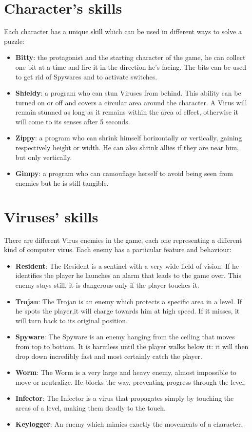 \documentclass[12pt, a4paper]{report}
\begin{document}
\section*{Character’s skills}
Each character has a unique skill which can be used in different ways to solve a puzzle:
\begin{itemize}
	\item \textbf{Bitty}: the protagonist and the starting character of the game, he can collect one bit at a time and fire it in the direction he’s facing. The bits can be used to get rid of Spywares and to activate switches.
	\item \textbf{Shieldy}: a program who can stun Viruses from behind. This ability can be turned on or off and covers a circular area around the 				character. A Virus will remain stunned as long as it remains within the area of effect, otherwise it will come to its senses after 5 seconds.
	\item \textbf{Zippy}:  a program who can shrink himself horizontally or vertically, gaining respectively height or width. He can also shrink allies if they are near him, but only vertically.
	\item \textbf{Gimpy}: a program who can camouflage herself to avoid being seen from enemies but he is still tangible.
\end{itemize}

\section*{Viruses' skills}
There are different Virus enemies in the game, each one representing a different kind of computer virus. Each enemy has a particular feature and behaviour:
\begin{itemize}
	\item \textbf{Resident}: The Resident is a sentinel with a very wide field of vision. If he identifies the player he launches an alarm that leads to the game 		over. This enemy stays still, it is dangerous only if the player touches it.
	\item \textbf{Trojan}: The Trojan is an enemy which protects a specific area in a level. If he spots the player,it will charge towards him at high speed. If it misses, it will turn back to its original position.
	\item \textbf{Spyware}: The Spyware is an enemy hanging from the ceiling that moves from top to bottom. It is harmless until the player walks below it: it will then drop down incredibly fast and most certainly catch the player.
	\item \textbf{Worm}: The Worm is a very large and heavy enemy, almost impossible to move or neutralize. He blocks the way, preventing progress through the level.
	\item \textbf{Infector}: The Infector is a virus that propagates simply by touching the areas of a level, making them deadly to the touch.
	\item \textbf{Keylogger}: An enemy which mimics exactly the movements of a character.
\end{itemize}
\end{document}
